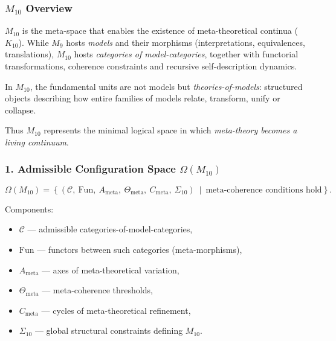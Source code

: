 

\subsubsection{$M_{10}$ Overview}
\label{sec:m10-overview}

$M_{10}$ is the meta-space that enables the existence of 
meta-theoretical continua ($K_{10}$).  
While $M_9$ hosts \emph{models} and their morphisms 
(interpretations, equivalences, translations),  
$M_{10}$ hosts \emph{categories of model-categories},  
together with functorial transformations,
coherence constraints and recursive self-description dynamics.

In $M_{10}$, the fundamental units are not models but \emph{theories-of-models}:
structured objects describing how entire families of models relate, transform,
unify or collapse.

Thus $M_{10}$ represents the minimal logical space in which
\emph{meta-theory becomes a living continuum}.

\subsubsection*{1. Admissible Configuration Space $\Omega(M_{10})$}

\[
\Omega(M_{10}) =
\left\{
(\mathcal{C},\ \mathrm{Fun},\ A_{\mathrm{meta}},\
\Theta_{\mathrm{meta}},\ C_{\mathrm{meta}},\ \Sigma_{10})
\ \middle|\ 
\text{meta-coherence conditions hold}
\right\}.
\]

Components:

\begin{itemize}
    \item $\mathcal{C}$ — admissible categories-of-model-categories,
    \item $\mathrm{Fun}$ — functors between such categories (meta-morphisms),
    \item $A_{\mathrm{meta}}$ — axes of meta-theoretical variation,
    \item $\Theta_{\mathrm{meta}}$ — meta-coherence thresholds,
    \item $C_{\mathrm{meta}}$ — cycles of meta-theoretical refinement,
    \item $\Sigma_{10}$ — global structural constraints defining $M_{10}$.
\end{itemize}

